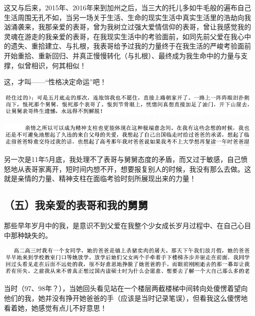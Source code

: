 \documentclass[9pt, b5paper]{article}
\begin{document}
这又与后来，2015年、2016年来到加州之后，当三大的托儿多如牛毛般的遍布自己生活周围无孔不如，当另一场关于生活、生命的现实生活中真实生活里的浩劫向我汹涌袭来，我那亲爱的表哥，曾为我树立过强大爱情信仰的表哥，曾让我感觉我的灵魂在游走的我亲爱的表哥，在我现实生活中的考验面前，如同先前父爱在我心中的遗失、重拾建立、与扎根，我表哥给予过我的力量终于在我生活的严峻考验面前开始重拾、重新回归、并真正慢慢转化（与扎根）、最终成为我生命中的力量与支撑，似曾相识，何其相似！

这，才叫——“性格决定命运”吧！

\begin{center}
\includegraphics[width=.9\linewidth]{./pic/backups_plans_20210422_180127.png}
\end{center}

\begin{center}
\includegraphics[width=.9\linewidth]{./pic/backups_plans_20210422_223454.png}
\end{center}

另一次是11年5月底，我处理不了表哥与舅舅态度的矛盾，而又过于敏感，自己愤怒地从表哥家离开，短时间内想不开，想要报复别人的时候，我没有那么去做。这就是亲情的力量、精神支柱在面临考验时刻所展现出来的力量！

\subsection{（五）我亲爱的表哥和我的舅舅}
\label{sec:org877529e}

那些早年岁月中的我，是意识不到父爱在我整个少女成长岁月过程中、在自己心目中那种缺失的。

\begin{center}
\includegraphics[width=.9\linewidth]{./pic/backups_plans_20210423_104856.png}
\end{center}

当时（97、98年？），当她回头看见站在一个楼层两截楼梯中间转向处傻愣着望向他们的我，她并没有挣开她爸爸的手（应该是当时记录笔误），但看我这么傻愣地看着她，她感觉有点儿不好意思！
\end{document}
